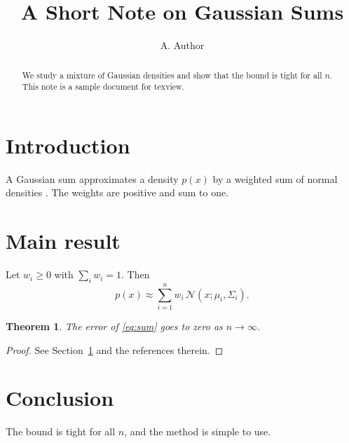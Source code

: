\documentclass[11pt]{article}
\title{A Short Note on Gaussian Sums}
\author{A. Author}
\date{}
\newtheorem{theorem}{Theorem}
\begin{document}
\maketitle

\begin{abstract}
We study a mixture of Gaussian densities and show that the bound is tight
for all $n$. This note is a sample document for texview.
\end{abstract}

\section{Introduction}
\label{sec:intro}
A Gaussian sum approximates a density $p(x)$ by a weighted sum of normal
densities \cite{alspach1972}. The weights are positive and sum to one.

\section{Main result}
Let $w_i \ge 0$ with $\sum_i w_i = 1$. Then
\begin{equation}
  p(x) \approx \sum_{i=1}^{n} w_i \, \mathcal{N}(x; \mu_i, \Sigma_i).
  \label{eq:sum}
\end{equation}

\begin{theorem}
The error of \eqref{eq:sum} goes to zero as $n \to \infty$.
\end{theorem}

\begin{proof}
See Section~\ref{sec:intro} and the references therein.
\end{proof}

\section{Conclusion}
The bound is tight for all $n$, and the method is simple to use.



\end{document}
